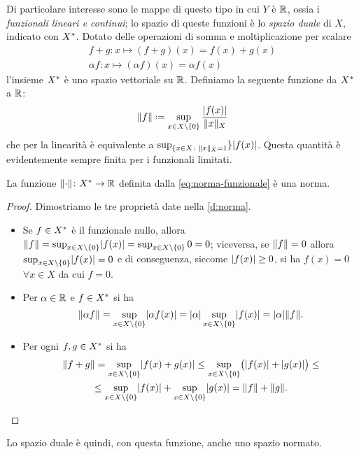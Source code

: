 Di particolare interesse sono le mappe di questo tipo in cui $Y$ è $\mathbb{R}$, ossia i \emph{funzionali lineari e continui}; lo spazio di queste funzioni è lo \emph{spazio duale} di $X$, indicato con $X^{\ast}$.
Dotato delle operazioni di somma e moltiplicazione per scalare
\begin{equation}
    \begin{gathered}
        f+g\colon x\mapsto (f+g)(x)=f(x)+g(x)\\
        \alpha f\colon x\mapsto (\alpha f)(x)=\alpha f(x)
    \end{gathered}
\end{equation}
l'insieme $X^{\ast}$ è uno spazio vettoriale su $\mathbb{R}$.
Definiamo la seguente funzione da $X^{\ast}$ a $\mathbb{R}$:
\begin{equation}
    \norm{f}\defeq\sup_{x\in X\setminus\{0\}}\frac{\abs{f(x)}}{\norm{x}_X}
    \label{eq:norma-funzionale}
\end{equation}
che per la linearità è equivalente a $\sup_{\{x\in X\colon\lVert x\rVert_X=1}\}\lvert f(x)\rvert$.
Questa quantità è evidentemente sempre finita per i funzionali limitati.
\begin{proprieta} \label{pr:norma-funzionale}
    La funzione $\lVert\cdot\rVert\colon X^{\ast}\to\mathbb{R}$ definita dalla \eqref{eq:norma-funzionale} è una norma.
\end{proprieta}
\begin{proof}
    Dimostriamo le tre proprietà date nella \ref{d:norma}.
    \begin{itemize}
        \item Se $f\in X^{\ast}$ è il funzionale nullo, allora $\lVert f\rVert=\sup_{x\in X\setminus\{0\}}\lvert f(x)\rvert=\sup_{x\in X\setminus\{0\}}0=0$; viceversa, se $\lVert f\rVert=0$ allora $\sup_{x\in X\setminus\{0\}}\lvert f(x)\rvert=0$ e di conseguenza, siccome $\lvert f(x)\rvert\ge 0$, si ha $f(x)=0$ $\forall x\in X$ da cui $f=0$.
        \item Per $\alpha\in\mathbb{R}$ e $f\in X^{\ast}$ si ha
            \begin{equation}
                \lVert\alpha f\rVert=
                \sup_{x\in X\setminus\{0\}}\lvert\alpha f(x)\rvert=
                \lvert\alpha\rvert\sup_{x\in X\setminus\{0\}}\lvert f(x)\rvert=
                \lvert\alpha\rvert\lVert f\rVert.
            \end{equation}
        \item Per ogni $f,g\in X^{\ast}$ si ha
            \begin{multline}
                \lVert f+g\rVert=
                \sup_{x\in X\setminus\{0\}}\lvert f(x)+g(x)\rvert\le
                \sup_{x\in X\setminus\{0\}}\bigl(\lvert f(x)\rvert+\lvert g(x)\rvert\bigr)\le\\ \le
                \sup_{x\in X\setminus\{0\}}\lvert f(x)\rvert+\sup_{x\in X\setminus\{0\}}\lvert g(x)\rvert=
                \lVert f\rVert+\lVert g\rVert.\qedhere
            \end{multline}
    \end{itemize}
\end{proof}
Lo spazio duale è quindi, con questa funzione, anche uno spazio normato.

